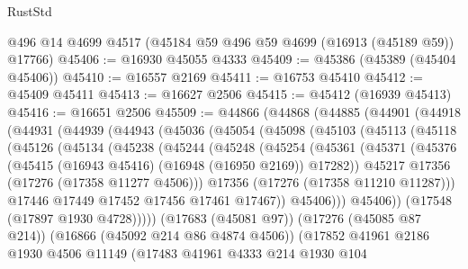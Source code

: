 \begin{lexlean}{RustStd}
\begin{coremodule}
    @496
    @14
    @4699
    @4517
    (@45184 @59 @496 @59 @4699 (@16913 (@45189 @59)) @17766)
@45406 := @16930 @45055 @4333
@45409 := @45386 (@45389 (@45404 @45406))
@45410 := @16557 @2169
@45411 := @16753 @45410
@45412 := @45409 @45411
@45413 := @16627 @2506
@45415 := @45412 (@16939 @45413)
@45416 := @16651 @2506
@45509 := @44866
    (@44868
      (@44885
        (@44901
          (@44918
            (@44931
              (@44939
                (@44943
                  (@45036
                    (@45054
                      (@45098
                        (@45103
                          (@45113
                            (@45118
                              (@45126
                                (@45134
                                  (@45238
                                    (@45244
                                      (@45248
                                        (@45254
                                          (@45361
                                            (@45371
                                              (@45376
                                                (@45415
                                                  (@16943 @45416)
                                                  (@16948 (@16950 @2169))
                                                  @17282))
                                              @45217
                                              @17356
                                              (@17276 (@17358 @11277 @4506)))
                                            @17356
                                            (@17276 (@17358 @11210 @11287)))
                                          @17446
                                          @17449
                                          @17452
                                          @17456
                                          @17461
                                          @17467))
                                      @45406)))
                                @45406))
                            (@17548 (@17897 @1930 @4728)))))
                      (@17683 (@45081 @97))
                      (@17276 (@45085 @87 @214))
                      (@16866 (@45092 @214 @86 @4874 @4506))
                      (@17852
                        @41961
                        @2186
                        @1930
                        @4506
                        @11149
                        (@17483
                          @41961
                          @4333
                          @214
                          @1930
                          @104

\end{coremodule}
\end{lexlean}
